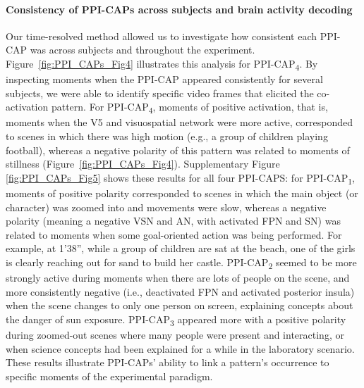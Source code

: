 \paragraph{Consistency of PPI-CAPs across subjects and brain activity decoding} Our time-resolved method allowed us to investigate how consistent each PPI-CAP was across subjects and throughout the experiment. Figure~\ref{fig:PPI_CAPs_Fig4} illustrates this analysis for PPI-CAP\textsubscript{4}. By inspecting moments when the PPI-CAP appeared consistently for several subjects, we were able to identify specific video frames that elicited the co-activation pattern. For PPI-CAP\textsubscript{4},  moments of positive activation, that is, moments when the V5 and visuospatial network were more active, corresponded to scenes in which there was high motion (e.g., a group of children playing football), whereas a negative polarity of this pattern was related to moments of stillness (Figure~\ref{fig:PPI_CAPs_Fig4}).
Supplementary Figure \ref{fig:PPI_CAPs_Fig5} shows these results for all four PPI-CAPS: for PPI-CAP\textsubscript{1}, moments of positive polarity corresponded to scenes in which the main object (or character) was zoomed into and movements were slow, whereas a negative polarity (meaning a negative VSN and AN, with activated FPN and SN) was related to moments when some goal-oriented action was being performed. For example, at 1'38'', while a group of children are sat at the beach, one of the girls is clearly reaching out for sand to build her castle.   PPI-CAP\textsubscript{2} seemed to be more strongly active during moments when there are lots of people on the scene, and more consistently negative (i.e., deactivated FPN and activated posterior insula) when the scene changes to only one person on screen, explaining concepts about the danger of sun exposure. PPI-CAP\textsubscript{3} appeared more with a positive polarity during zoomed-out scenes where many people were present and interacting, or when science concepts had been explained for a while in the laboratory scenario. These results illustrate PPI-CAPs' ability to link a pattern's occurrence to specific moments of the experimental paradigm.


